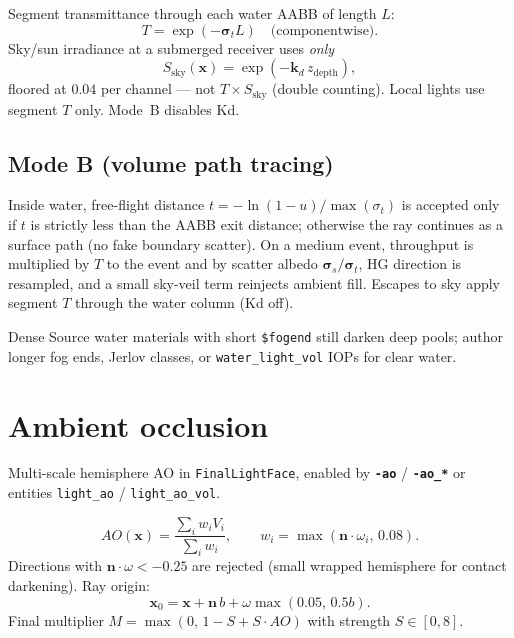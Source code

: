 \documentclass[11pt,a4paper]{article}
\newcommand{\flag}[1]{\texttt{\bfseries #1}}
\newcommand{\vmt}[1]{\texttt{\$#1}}
\newcommand{\ent}[1]{\texttt{#1}}
\newcommand{\code}[1]{\texttt{#1}}
\newcommand{\vect}[1]{\bm{#1}}
\begin{document}
Segment transmittance through each water AABB of length $L$:
\begin{equation}
  T=\exp(-\vect{\sigma}_t L)
  \quad\text{(componentwise)}.
\end{equation}
Sky/sun irradiance at a submerged receiver uses \emph{only}
\begin{equation}
  S_{\mathrm{sky}}(\vect{x})=\exp(-\vect{k}_d\, z_{\mathrm{depth}}),
\end{equation}
floored at $0.04$ per channel --- not $T\times S_{\mathrm{sky}}$
(double counting). Local lights use segment $T$ only. Mode~B disables Kd.

\subsection{Mode B (volume path tracing)}

Inside water, free-flight distance $t=-\ln(1-u)/\max(\sigma_t)$ is accepted
only if $t$ is strictly less than the AABB exit distance; otherwise the ray
continues as a surface path (no fake boundary scatter). On a medium event,
throughput is multiplied by $T$ to the event and by scatter albedo
$\vect{\sigma}_s/\vect{\sigma}_t$, HG direction is resampled, and a small
sky-veil term reinjects ambient fill. Escapes to sky apply segment $T$
through the water column (Kd off).

\begin{warnbox}
  Dense Source water materials with short \vmt{fogend} still darken deep
  pools; author longer fog ends, Jerlov classes, or \ent{water\_light\_vol}
  IOPs for clear water.
\end{warnbox}

\section{Ambient occlusion}
\label{sec:ao}

Multi-scale hemisphere AO in \code{FinalLightFace}, enabled by \flag{-ao} /
\flag{-ao\_*} or entities \ent{light\_ao} / \ent{light\_ao\_vol}.

\begin{equation}
  AO(\vect{x})
  =
  \frac{\sum_i w_i V_i}{\sum_i w_i},
  \qquad
  w_i=\max(\vect{n}\cdot\omega_i,\,0.08).
\end{equation}
Directions with $\vect{n}\cdot\omega<-0.25$ are rejected (small wrapped
hemisphere for contact darkening). Ray origin:
\begin{equation}
  \vect{x}_0
  =
  \vect{x}+\vect{n}\,b+\omega\max(0.05,\,0.5 b).
\end{equation}
Final multiplier $M=\max(0,\,1-S+S\cdot AO)$ with strength $S\in[0,8]$.
\end{document}
